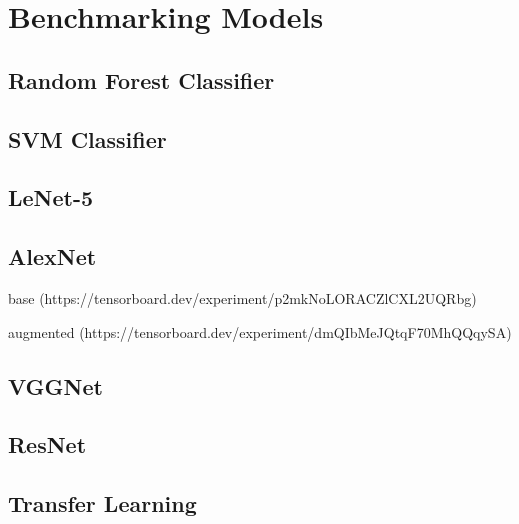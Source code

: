 \chapter{Benchmarking Models} \label{chap:benchmark}

\section{Random Forest Classifier}

\section{SVM Classifier}

\section{LeNet-5}

\section{AlexNet}
base (https://tensorboard.dev/experiment/p2mkNoLORACZlCXL2UQRbg)


augmented (https://tensorboard.dev/experiment/dmQIbMeJQtqF70MhQQqySA)

\section{VGGNet}

\section{ResNet}

\section{Transfer Learning}